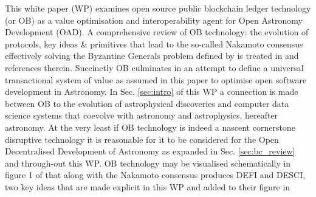 \documentclass[final,5p,times,twocolumn,authoryear]{elsarticle}
\begin{document}
This white paper (WP) examines open source public blockchain ledger technology (or OB) as a value optimisation and interoperability agent for Open Astronomy Development (OAD). A comprehensive review of OB technology: the evolution of protocols, key ideas \& primitives that lead to the so-called Nakamoto consensus effectively solving the Byzantine Generals problem defined by \cite{Lamport1982TheBG} is treated in  \cite{arvindandclark2017} and references therein. Succinctly OB culminates in an attempt to define a universal transactional system of value as assumed in this paper to optimise open software development in Astronomy. In Sec. \ref{sec:intro} of this WP a connection is made between OB to the evolution of astrophysical discoveries and computer data science systems that coevolve with astronomy and astrophysics, hereafter astronomy. At the very least if OB technology is indeed a nascent cornerstone disruptive technology it is reasonable for it to be considered for the Open Decentralised Development of Astronomy as expanded in Sec. \ref{sec:bc_review} and through-out this WP.  OB technology may be visualised schematically in figure 1 of \cite{arvindandclark2017} that along with the Nakamoto consensus produces DEFI and DESCI, two key ideas that are made explicit in this WP and added to their figure in
\end{document}
